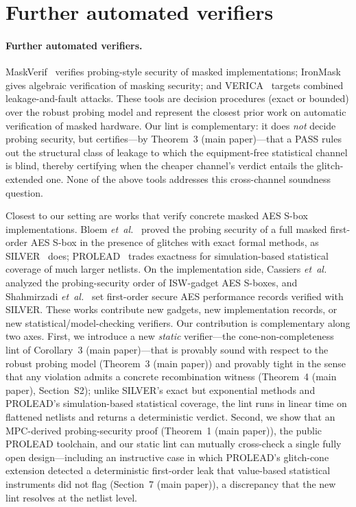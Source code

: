 \documentclass[journal,onecolumn]{IEEEtran}
\begin{document}
\section{Further automated verifiers}
\label{app:further-verifiers}

\paragraph{Further automated verifiers.}
MaskVerif~\cite{maskverif2015} verifies probing-style security of
masked implementations;
IronMask~\cite{ironmask2022} gives algebraic verification of masking
security; and
VERICA~\cite{verica2022} targets combined leakage-and-fault attacks.
These tools are decision procedures (exact or
bounded) over the robust probing model and represent the closest
prior work on automatic verification of masked hardware. Our lint
is complementary: it does \emph{not} decide probing security, but
certifies---by Theorem~3 (main paper)---that a PASS rules
out the structural class of leakage to which the
equipment-free statistical channel is blind, thereby certifying
when the cheaper channel's verdict entails the glitch-extended
one. None of the above tools addresses this cross-channel
soundness question.

Closest to our setting are works that verify concrete masked AES
S-box implementations.  Bloem \emph{et~al.}~\cite{bloem2018formal}
proved the probing security of a full masked first-order AES S-box in
the presence of glitches with exact formal methods, as
SILVER~\cite{knichel2020silver} does;
PROLEAD~\cite{muller2022prolead} trades exactness for
simulation-based statistical coverage of much larger netlists.  On
the implementation side, Cassiers
\emph{et~al.}~\cite{cassiers2021tight} analyzed the probing-security
order of ISW-gadget AES S-boxes, and
Shahmirzadi \emph{et~al.}~\cite{shahmirzadi2021records} set
first-order secure AES performance records verified with SILVER.
These works contribute new gadgets, new implementation records, or
new statistical/model-checking verifiers. Our contribution is
complementary along two axes. First, we introduce a new
\emph{static} verifier---the cone-non-completeness lint of
Corollary~3 (main paper)---that is provably sound with respect to
the robust probing model (Theorem~3 (main paper)) and
provably tight in the sense that any violation admits a concrete
recombination witness (Theorem~4 (main paper),
Section~S2); unlike SILVER's exact but exponential
methods and PROLEAD's simulation-based statistical coverage, the
lint runs in linear time on flattened netlists and returns a
deterministic verdict. Second, we show that an MPC-derived
probing-security proof (Theorem~1 (main paper)), the public PROLEAD toolchain,
and our static lint can mutually cross-check a single fully open
design---including an instructive case in which PROLEAD's
glitch-cone extension detected a deterministic first-order leak
that value-based statistical instruments did not flag
(Section~7 (main paper)), a discrepancy that the new lint
resolves at the netlist level.
\end{document}
